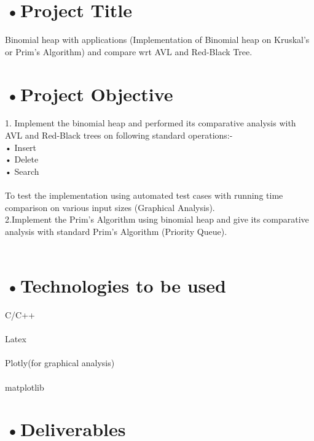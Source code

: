 \section*{•Project Title}

      Binomial heap with applications (Implementation of Binomial heap on Kruskal’s or Prim’s Algorithm) and compare wrt AVL and Red-Black Tree.
      
\section*{•Project Objective}
	
	1. Implement the binomial heap and performed its comparative analysis with AVL and Red-Black trees on following standard operations:-\\
    • Insert\\
    • Delete\\
    • Search\\
\\To test the implementation using automated test cases with running time comparison on various input sizes (Graphical Analysis).\\

	2.Implement the Prim’s Algorithm using binomial heap and give its comparative analysis with standard Prim’s Algorithm (Priority Queue).\\ \\ 
	
\section*{•Technologies to be used}

	C/C++\\
	\\Latex\\
	\\Plotly(for graphical analysis)\\
	\\matplotlib


\section*{•Deliverables}

